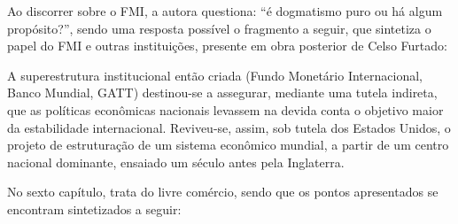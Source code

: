 	Ao discorrer sobre o FMI, a autora questiona: ``é dogmatismo puro ou há algum propósito?'', sendo uma resposta possível o fragmento a seguir, que sintetiza o papel do FMI e outras instituições, presente em obra posterior de Celso Furtado:
	
	\begin{citacao}
		A superestrutura institucional então criada (Fundo Monetário Internacional, Banco Mundial, GATT) destinou-se a assegurar, mediante uma tutela indireta, que as políticas econômicas nacionais levassem na devida conta o objetivo maior da estabilidade internacional. Reviveu-se, assim, sob tutela dos Estados Unidos, o projeto de estruturação de um sistema econômico mundial, a partir de um centro nacional dominante, ensaiado um século antes pela Inglaterra.
		\cite[pág. 26]{Furtado2000}
	\end{citacao}
	
	No sexto capítulo,  trata do livre comércio, sendo que os pontos apresentados se encontram sintetizados a seguir:

